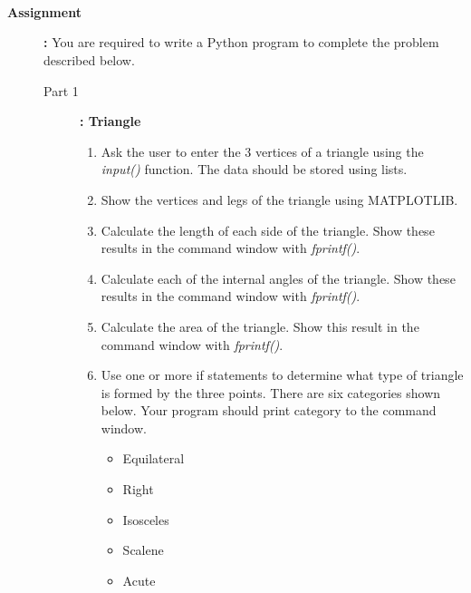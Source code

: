 \documentclass[12pt]{article}
\begin{document}
\begin{description}
\begin{itemize}
         \vspace{2mm}\\
         \vspace{2mm}\\
         \vspace{2mm}\\    

    \end{itemize}
 \vspace{20mm}
 
\newpage
\item [\textbf{Assignment}]\textbf{:} You are required to write a Python program to complete the problem described below.
			\begin{description}
			\item[Part 1]\textbf{: Triangle}
			\begin{enumerate}
				\item Ask the user to enter the 3 vertices of a triangle using the {\it input()} function. The data should be stored using lists.  \\
		\item Show the vertices and legs of the triangle using MATPLOTLIB.  \\
                \item Calculate the length of each side of the triangle. Show these results in the command window with {\it fprintf()}. \\
		\item Calculate each of the internal angles of the triangle. Show these results in the command window  with {\it fprintf()}. \\  
			\item Calculate the area of the triangle. Show this result in the command window  with {\it fprintf()}. \\  
			\item Use one or more if statements to determine what type of triangle is formed by the three points. There are six categories shown below. Your program should print category to the command window. \\
\begin{itemize}
\item Equilateral
\item Right
\item Isosceles
\item Scalene
\item Acute 

\end{itemize}
\end{enumerate}
\end{description}
\end{description}
\end{document}
